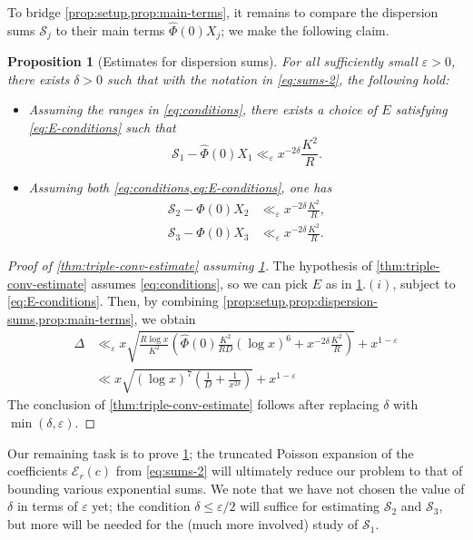 \documentclass[reqno,11pt]{amsart}
\newtheorem{proposition}[theorem]{Proposition}
\theoremstyle{definition}
\theoremstyle{remark}
\numberwithin{equation}{section}
\newcommand{\mE}{\mathcal{E}}
\newcommand{\mS}{\mathcal{S}}
\newcommand{\eps}{\varepsilon}
\renewcommand{\hat}{\widehat}
\begin{document}
To bridge \cref{prop:setup,prop:main-terms}, it remains to compare the dispersion sums $\mS_j$ to their main terms $\hat{\Phi}(0) X_j$; we make the following claim.


\begin{proposition}[Estimates for dispersion sums] \label{prop:dispersion-sums}
For all sufficiently small $\eps > 0$, there exists $\delta > 0$ such that with the notation in \cref{eq:sums-2}, the following hold:
\begin{itemize}
\item[(i).] Assuming the ranges in \cref{eq:conditions}, there exists a choice of $E$ satisfying \cref{eq:E-conditions} such that 
\begin{equation} \label{eq:S1-estimate}
    \mS_1 - \hat{\Phi}(0)X_1 \ll_\eps x^{-2\delta} \frac{K^2}{R}.
\end{equation}
\item[(ii).] Assuming both \cref{eq:conditions,eq:E-conditions}, one has
\begin{align} \label{eq:S2-estimate}
    \mS_2 - \hat{\Phi}(0)X_2 &\ll_\eps x^{-2\delta} \frac{K^2}{R}, \\
    \label{eq:S3-estimate}
    \mS_3 - \hat{\Phi}(0)X_3 &\ll_\eps x^{-2\delta} \frac{K^2}{R}.
\end{align}
\end{itemize}
\end{proposition} 

\begin{proof}[Proof of \cref{thm:triple-conv-estimate} assuming \cref{prop:dispersion-sums}]
The hypothesis of \cref{thm:triple-conv-estimate} assumes \cref{eq:conditions}, so we can pick $E$ as in \cref{prop:dispersion-sums}.$(i)$, subject to \cref{eq:E-conditions}. Then, by combining \cref{prop:setup,prop:dispersion-sums,prop:main-terms}, we obtain
\[
\begin{aligned}
    \Delta
    &\ll_\eps
    x\sqrt{\frac{R\log x}{K^2} \left(\hat{\Phi}(0)\frac{K^2}{RD}(\log x)^6 + x^{-2\delta} \frac{K^2}{R} \right)} + x^{1-\eps}
    \\
    &\ll
    x\sqrt{(\log x)^7 \left(\frac{1}{D} + \frac{1}{x^{2\delta}}\right)} + x^{1-\eps}
\end{aligned}
\]
The conclusion of \cref{thm:triple-conv-estimate} follows after replacing $\delta$ with $\min(\delta, \eps)$.
\end{proof} 

Our remaining task is to prove  \cref{prop:dispersion-sums}; the truncated Poisson expansion of the coefficients $\mE_r(c)$ from \cref{eq:sums-2} will ultimately reduce our problem to that of bounding various exponential sums. We note that we have not chosen the value of $\delta$ in terms of $\eps$ yet; the condition $\delta \le \eps/2$ will suffice for estimating $\mS_2$ and $\mS_3$, but more will be needed for the (much more involved) study of $\mS_1$.
\end{document}
